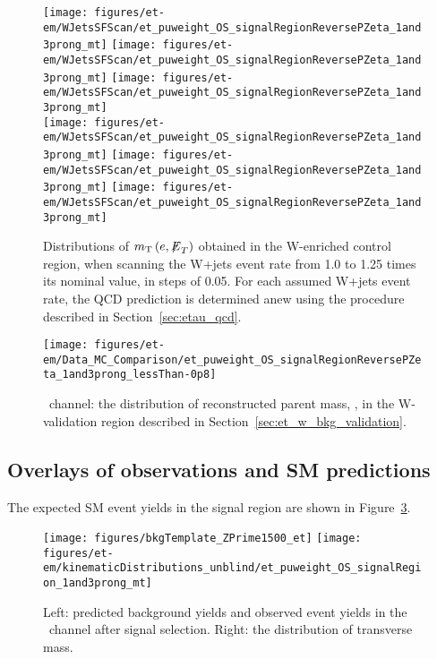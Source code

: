 \begin{figure}[thbp!]\centering
  \texttt{[image: figures/et-em/WJetsSFScan/et\_puweight\_OS\_signalRegionReversePZeta\_1and3prong\_mt]}
  \texttt{[image: figures/et-em/WJetsSFScan/et\_puweight\_OS\_signalRegionReversePZeta\_1and3prong\_mt]}
  \texttt{[image: figures/et-em/WJetsSFScan/et\_puweight\_OS\_signalRegionReversePZeta\_1and3prong\_mt]}\\
  \texttt{[image: figures/et-em/WJetsSFScan/et\_puweight\_OS\_signalRegionReversePZeta\_1and3prong\_mt]}
  \texttt{[image: figures/et-em/WJetsSFScan/et\_puweight\_OS\_signalRegionReversePZeta\_1and3prong\_mt]}
  \texttt{[image: figures/et-em/WJetsSFScan/et\_puweight\_OS\_signalRegionReversePZeta\_1and3prong\_mt]}
  \caption{\label{fig:etau_w_sf} Distributions of
    $m_\mathrm{T}\left(e,{\not\mathrel{E}}_T\right)$ obtained in the W-enriched
    control region, when scanning the W+jets event rate from 1.0 to
    1.25 times its nominal value, in steps of 0.05.  For each assumed
    W+jets event rate, the QCD prediction is determined anew using the
    procedure described in Section~\ref{sec:etau_qcd}.}
\end{figure}

\begin{figure}[thbp!]\centering
  \texttt{[image: figures/et-em/Data\_MC\_Comparison/et\_puweight\_OS\_signalRegionReversePZeta\_1and3prong\_lessThan-0p8]}
  \caption{\label{fig:et_meff_flipped_pz} \teth ~channel: the
    distribution of reconstructed parent mass, \meffetau, in the
    W-validation region described in
    Section~\ref{sec:et_w_bkg_validation}.}
\end{figure}

\clearpage
\subsection{Overlays of observations and SM predictions}
\label{sec:et_overlays}

The expected SM event yields in the signal region are shown in
Figure~\ref{fig:etau_sm_template_and_mt}.
\begin{figure}[thbp!]\centering
  \texttt{[image: figures/bkgTemplate\_ZPrime1500\_et]}
  \texttt{[image: figures/et-em/kinematicDistributions\_unblind/et\_puweight\_OS\_signalRegion\_1and3prong\_mt]}
  \caption{\label{fig:etau_sm_template_and_mt} Left: predicted
    background yields and observed event yields in the \teth ~channel
    after signal selection.  Right: the distribution of transverse
    mass.}
\end{figure}

